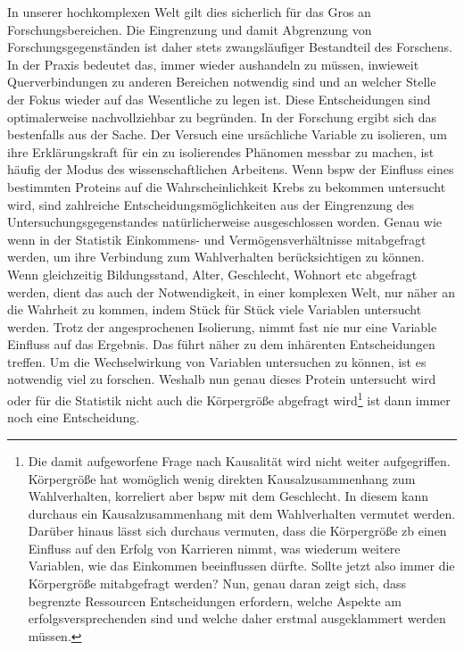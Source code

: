 In unserer hochkomplexen Welt gilt dies sicherlich für das Gros an Forschungsbereichen. Die Eingrenzung und damit Abgrenzung von Forschungsgegenständen ist daher stets zwangsläufiger Bestandteil des Forschens. In der Praxis bedeutet das, immer wieder aushandeln zu müssen, inwieweit Querverbindungen zu anderen Bereichen notwendig sind und an welcher Stelle der Fokus wieder auf das Wesentliche zu legen ist.
Diese Entscheidungen sind optimalerweise nachvollziehbar zu begründen. In der Forschung ergibt sich das bestenfalls aus der Sache. Der Versuch eine ursächliche Variable zu isolieren, um ihre Erklärungskraft für ein zu isolierendes Phänomen messbar zu machen, ist häufig der Modus des wissenschaftlichen Arbeitens. Wenn \gls{bspw} der Einfluss eines bestimmten Proteins auf die Wahrscheinlichkeit Krebs zu bekommen untersucht wird, sind zahlreiche Entscheidungsmöglichkeiten aus der Eingrenzung des Untersuchungsgegenstandes natürlicherweise ausgeschlossen worden. Genau wie wenn in der Statistik Einkommens- und Vermögensverhältnisse mitabgefragt werden, um ihre Verbindung zum Wahlverhalten berücksichtigen zu können. Wenn gleichzeitig Bildungsstand, Alter, Geschlecht, Wohnort \gls{etc} abgefragt werden, dient das auch der Notwendigkeit, in einer komplexen Welt, nur näher an die Wahrheit zu kommen, indem Stück für Stück viele Variablen untersucht werden. Trotz der angesprochenen Isolierung, nimmt fast nie nur eine Variable Einfluss auf das Ergebnis. Das führt näher zu dem inhärenten Entscheidungen treffen. Um die Wechselwirkung von Variablen untersuchen zu können, ist es notwendig viel zu forschen. Weshalb nun genau dieses Protein untersucht wird 
oder für die Statistik nicht auch die Körpergröße abgefragt wird\footnote{
    Die damit aufgeworfene Frage nach Kausalität wird nicht weiter aufgegriffen. Körpergröße hat womöglich wenig direkten Kausalzusammenhang zum Wahlverhalten, korreliert aber \gls{bspw} mit dem Geschlecht. In diesem kann durchaus ein Kausalzusammenhang mit dem Wahlverhalten vermutet werden. Darüber hinaus lässt sich durchaus vermuten, dass die Körpergröße \gls{zb} einen Einfluss auf den Erfolg von Karrieren nimmt, was wiederum weitere Variablen, wie das Einkommen beeinflussen dürfte. Sollte jetzt also immer die Körpergröße mitabgefragt werden? Nun, genau daran zeigt sich, dass begrenzte Ressourcen Entscheidungen erfordern, welche Aspekte am erfolgsversprechenden sind und welche daher erstmal ausgeklammert werden müssen. 
} ist dann immer noch eine Entscheidung. 


